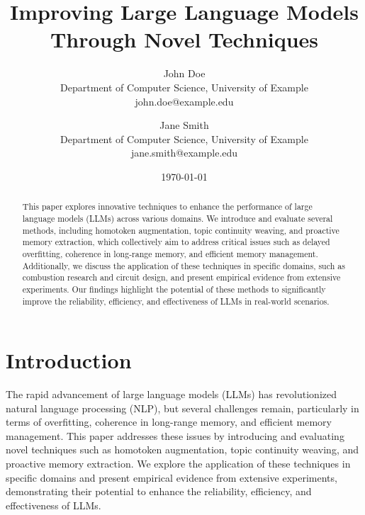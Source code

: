 \documentclass{article}
\begin{document}
\title{Improving Large Language Models Through Novel Techniques}
\author{John Doe \\
Department of Computer Science, University of Example \\
john.doe@example.edu \\
\and Jane Smith \\
Department of Computer Science, University of Example \\
jane.smith@example.edu \\
}
\date{\today}
\maketitle

\begin{abstract}
This paper explores innovative techniques to enhance the performance of large language models (LLMs) across various domains. We introduce and evaluate several methods, including homotoken augmentation, topic continuity weaving, and proactive memory extraction, which collectively aim to address critical issues such as delayed overfitting, coherence in long-range memory, and efficient memory management. Additionally, we discuss the application of these techniques in specific domains, such as combustion research and circuit design, and present empirical evidence from extensive experiments. Our findings highlight the potential of these methods to significantly improve the reliability, efficiency, and effectiveness of LLMs in real-world scenarios.
\end{abstract}

\section{Introduction}
The rapid advancement of large language models (LLMs) has revolutionized natural language processing (NLP), but several challenges remain, particularly in terms of overfitting, coherence in long-range memory, and efficient memory management. This paper addresses these issues by introducing and evaluating novel techniques such as homotoken augmentation, topic continuity weaving, and proactive memory extraction. We explore the application of these techniques in specific domains and present empirical evidence from extensive experiments, demonstrating their potential to enhance the reliability, efficiency, and effectiveness of LLMs.
\end{document}
